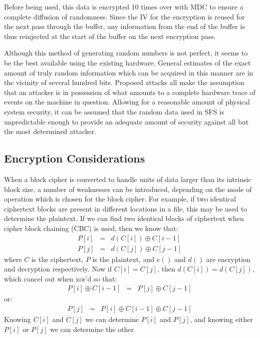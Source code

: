 Before being used, this data is encrypted 10 times over with MDC to ensure a
complete diffusion of randomness.  Since the IV for the encryption is reused
for the next pass through the buffer, any information from the end of the
buffer is thus reinjected at the start of the buffer on the next encryption
pass.

Although this method of generating random numbers is not perfect, it seems to
be the best available using the existing hardware.  General estimates of the
exact amount of truly random information which can be acquired in this manner
are in the vicinity of several hundred bits.  Proposed attacks all make the
assumption that an attacker is in possession of what amounts to a complete 
hardware trace of events on the machine in question.  Allowing for a reasonable 
amount of physical system security, it can be assumed that the random data used 
in SFS is unpredictable enough to provide an adequate amount of security 
against all but the most determined attacker.



\subsection{Encryption Considerations}

When a block cipher is converted to handle units of data larger than its
intrinsic block size, a number of weaknesses can be introduced, depending on
the mode of operation which is chosen for the block cipher.  For example, if
two identical ciphertext blocks are present in different locations in a file,
this may be used to determine the plaintext.  If we can find two identical
blocks of ciphertext when cipher block chaining (CBC) is used, then we know
that:
\begin{eqnarray*}
    P[ i ] & = & d( C[ i ] ) \oplus C[ i-1 ]\\
    P[ j ] & = & d( C[ j ] ) \oplus C[ j-1 ]
\end{eqnarray*}
where $C$ is the ciphertext, $P$ is the plaintext, and $e()$ and $d()$ are encryption
and decryption respectively.  Now if $C[ i ] = C[ j ]$, then $d( C[ i ] ) =
d( C[ j ] )$, which cancel out when xor'd so that:
\begin{eqnarray*}
    P[ i ] \oplus C[ i-1 ] & = & P[ j ] \oplus C[ j-1 ]
\end{eqnarray*}
or:
\begin{eqnarray*}
    P[ j ] & = & P[ i ] \oplus C[ i-1 ] \oplus C[ j-1 ]
\end{eqnarray*}
Knowing $C[ i ]$ and $C[ j ]$ we can determine $P[ i ]$ and $P[ j ]$, and knowing
either $P[ i ]$ or $P[ j ]$ we can determine the other.

